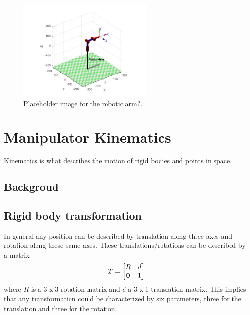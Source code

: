 

\begin{figure}[H]
    \centering
    \includegraphics[width=0.6\textwidth]{chapters/img/robot_arm.png}
    \caption{Placeholder image for the robotic arm?.}
    \label{fig:robotic_manipulator_general}
\end{figure}


\section*{Manipulator Kinematics} %
Kinematics is what describes the motion of rigid bodies and points in space. 

\subsection*{Backgroud}
\subsection*{Rigid body transformation}
In general any position can be described by translation along three axes and rotation along these same axes. These translations/rotations can be described by a matrix
\begin{equation}
    T = 
    \begin{bmatrix}
        R & d \\
        \bf{0} & 1
    \end{bmatrix}
\end{equation}
where \(R\) is a 3 x 3 rotation matrix and \(d\) a 3 x 1 translation matrix. This implies that any transformation could be characterized by six parameters, three for the translation and three for the rotation. \cite{spong}


